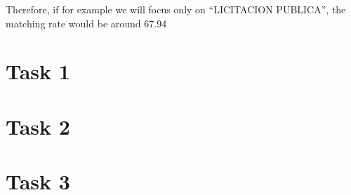 \documentclass[
]{article}
\begin{document}
Therefore, if for example we will focus only on ``LICITACION PUBLICA'',
the matching rate would be around 67.94

\hypertarget{task-1}{%
\section{Task 1}\label{task-1}}

\hypertarget{task-2}{%
\section{Task 2}\label{task-2}}

\hypertarget{task-3}{%
\section{Task 3}\label{task-3}}
\end{document}
